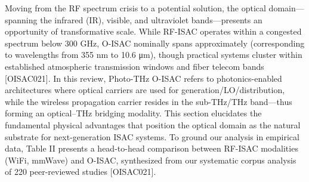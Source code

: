 {}
\markdownRendererSectionEnd \markdownRendererSectionBegin
{}\markdownRendererInterblockSeparator
{}Moving from the RF spectrum crisis to a potential solution, the optical domain—spanning the infrared (IR), visible, and ultraviolet bands—presents an opportunity of transformative scale. While RF-ISAC operates within a congested spectrum below 300 GHz, O-ISAC nominally spans approximately  (corresponding to wavelengths from 355 nm to 10.6 μm), though practical systems cluster within established atmospheric transmission windows and fiber telecom bands [O\markdownRendererUnderscore{}ISAC\markdownRendererUnderscore{}021]. In this review, Photo-THz O-ISAC refers to photonics-enabled architectures where optical carriers are used for generation/LO/distribution, while the wireless propagation carrier resides in the sub-THz/THz band—thus forming an optical–THz bridging modality. This section elucidates the fundamental physical advantages that position the optical domain as the natural substrate for next-generation ISAC systems.\markdownRendererInterblockSeparator
{}\markdownRendererSectionBegin
{}\markdownRendererInterblockSeparator
{}To ground our analysis in empirical data, Table II presents a head-to-head comparison between RF-ISAC modalities (WiFi, mmWave) and O-ISAC, synthesized from our systematic corpus analysis of 220 peer-reviewed studies [O\markdownRendererUnderscore{}ISAC\markdownRendererUnderscore{}021].\markdownRendererParagraphSeparator
{}\markdownRendererInterblockSeparator
{}\markdownRendererInterblockSeparator
